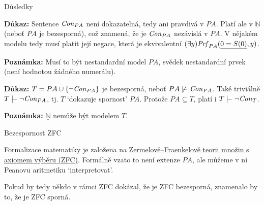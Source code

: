 \documentclass{beamer}
\begin{document}
\begin{frame}{Důsledky}    


    \textbf{Důkaz:}
        Sentence $\mathit{Con}_{PA}$ není dokazatelná, tedy ani pravdivá v $PA$. Platí ale v $\underline{\mathbb N}$ (neboť $PA$ je bezesporná), což znamená, že je $\mathit{Con}_{PA}$ nezávislá v $PA$. V nějakém modelu tedy musí platit její negace, která je ekvivalentní $(\exists y)\mathit{Prf}_{PA}(\underline{0=S(0)},y)$.            
    \hfill\qedsymbol

    \textbf{Poznámka:} Musí to být nestandardní model $PA$, svědek \alert{nestandardní} prvek (není hodnotou žádného numerálu).

    \bigskip


    \textbf{Důkaz:}
    $T=PA \cup \{\neg \mathit{Con}_{PA}\}$ je \alert{bezesporná}, neboť $PA\not\proves\Con_{PA}$. Také triviálně $T\proves\neg\Con_{PA}$, tj. $T$ `dokazuje spornost' $PA$. Protože $PA\subseteq T$, platí i $T\proves\neg\Con_T$.
    \hfill\qedsymbol

    \textbf{Poznámka:} $\underline{\mathbb{N}}$ nemůže být modelem $T$.
    
\end{frame}


\begin{frame}{Bezespornost ZFC}

    Formalizace matematiky je založena na \href{https://en.wikipedia.org/wiki/Zermelo\%E2\%80\%93Fraenkel_set_theory}{\alert{Zermelově–Fraenkelově teorii množin s axiomem výběru (ZFC)}}. Formálně vzato to není extenze $PA$, ale můžeme v ní Peanovu aritmetiku `interpretovat'.


    Pokud by tedy někdo v rámci ZFC dokázal, že je ZFC bezesporná, znamenalo by to, že je ZFC sporná.    

\end{frame}
\end{document}
